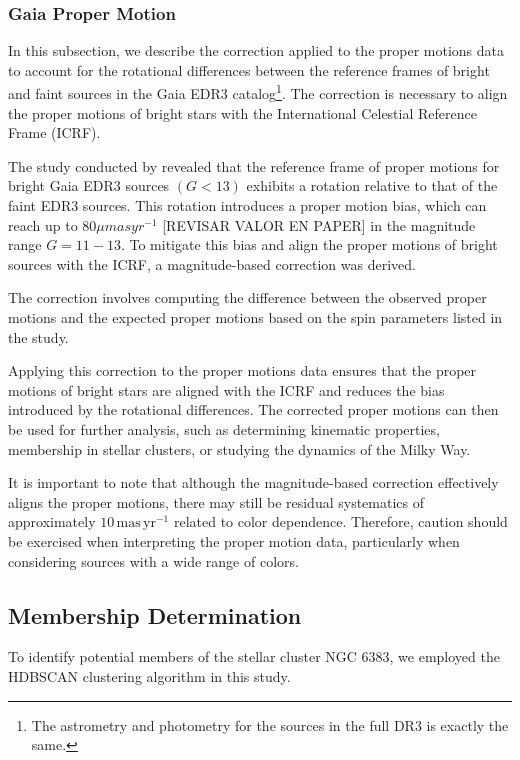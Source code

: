 \documentclass[fleqn,usenatbib,usedcolumn,useAMS]{mnras}
\begin{document}
\subsubsection{Gaia Proper Motion}

In this subsection, we describe the correction applied to the proper motions data to account for the rotational differences between the reference frames of bright and faint sources in the Gaia EDR3 catalog\footnote{The astrometry and photometry for the sources in the full DR3 is exactly the same.}. The correction is necessary to align the proper motions of bright stars with the International Celestial Reference Frame (ICRF).

The study conducted by \citet{2021A&A...649A.124C} revealed that the reference frame of proper motions for bright Gaia EDR3 sources $(G < 13)$ exhibits a rotation relative to that of the faint EDR3 sources. This rotation introduces a proper motion bias, which can reach up to $80 \mu mas yr^{-1}$ [REVISAR VALOR EN PAPER] in the magnitude range $G = 11-13$. To mitigate this bias and align the proper motions of bright sources with the ICRF, a magnitude-based correction was derived.

The correction involves computing the difference between the observed proper motions and the expected proper motions based on the spin parameters listed in the study.

Applying this correction to the proper motions data ensures that the proper motions of bright stars are aligned with the ICRF and reduces the bias introduced by the rotational differences. The corrected proper motions can then be used for further analysis, such as determining kinematic properties, membership in stellar clusters, or studying the dynamics of the Milky Way.

It is important to note that although the magnitude-based correction effectively aligns the proper motions, there may still be residual systematics of approximately $10\,\textrm{mas}\,\textrm{yr}^{-1}$ related to color dependence. Therefore, caution should be exercised when interpreting the proper motion data, particularly when considering sources with a wide range of colors.

\subsection{Membership Determination}\label{Membership Determination}

To identify potential members of the stellar cluster NGC 6383, we employed the HDBSCAN clustering algorithm in this study.
\end{document}
